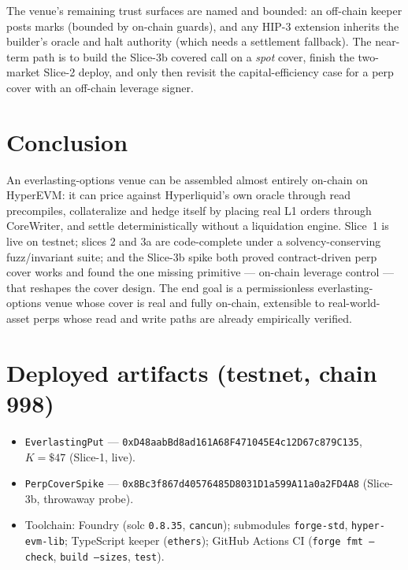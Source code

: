 \documentclass[11pt]{article}
\newcommand{\code}[1]{\texttt{\small #1}}
\begin{document}
The venue's remaining trust surfaces are named and bounded: an off-chain keeper posts marks (bounded
by on-chain guards), and any HIP-3 extension inherits the builder's oracle and halt authority (which
needs a settlement fallback). The near-term path is to build the Slice-3b covered call on a
\emph{spot} cover, finish the two-market Slice-2 deploy, and only then revisit the capital-efficiency
case for a perp cover with an off-chain leverage signer.

\section{Conclusion}

An everlasting-options venue can be assembled almost entirely on-chain on HyperEVM: it can price
against Hyperliquid's own oracle through read precompiles, collateralize and hedge itself by placing
real L1 orders through CoreWriter, and settle deterministically without a liquidation engine.
Slice~1 is live on testnet; slices 2 and 3a are code-complete under a solvency-conserving fuzz/invariant
suite; and the Slice-3b spike both proved contract-driven perp cover works and found the one missing
primitive --- on-chain leverage control --- that reshapes the cover design. The end goal is a
permissionless everlasting-options venue whose cover is real and fully on-chain, extensible to
real-world-asset perps whose read and write paths are already empirically verified.

\appendix
\section{Deployed artifacts (testnet, chain 998)}
\begin{itemize}[leftmargin=1.4em,itemsep=2pt]
  \item \code{EverlastingPut} --- \code{0xD48aabBd8ad161A68F471045E4c12D67c879C135}, $K=\$47$
        (Slice-1, live).
  \item \code{PerpCoverSpike} --- \code{0x8Bc3f867d40576485D8031D1a599A11a0a2FD4A8} (Slice-3b,
        throwaway probe).
  \item Toolchain: Foundry (solc \code{0.8.35}, \code{cancun}); submodules \code{forge-std},
        \code{hyper-evm-lib}; TypeScript keeper (\code{ethers}); GitHub Actions CI
        (\code{forge fmt --check}, \code{build --sizes}, \code{test}).
\end{itemize}
\end{document}
